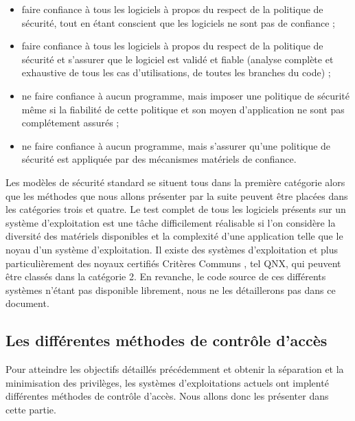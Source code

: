 \documentclass[pdftex,a4paper,titlepage,11pt]{article}
\begin{document}
\begin{itemize}
  \item faire confiance à tous les logiciels à propos du respect de la politique de sécurité, tout en étant conscient que les logiciels ne sont pas de confiance ;%
  \item faire confiance à tous les logiciels à propos du respect de la politique de sécurité et s'assurer que le logiciel est validé et fiable (analyse complète et exhaustive de tous les cas d'utilisations, de toutes les branches du code) ;%
  \item ne faire confiance à aucun programme, mais imposer une politique de sécurité même si la fiabilité de cette politique et son moyen d'application ne sont pas complétement assurés ;%
  \item ne faire confiance à aucun programme, mais s'assurer qu'une politique de sécurité est appliquée par des mécanismes matériels de confiance.%
\end{itemize}

Les modèles de sécurité standard se situent tous dans la première catégorie alors que les méthodes que nous allons présenter par la suite peuvent être placées dans les catégories trois et quatre. Le test complet de tous les logiciels présents sur un système d'exploitation est une tâche difficilement réalisable si l'on considère la diversité des matériels disponibles et la complexité d'une application telle que le noyau d'un système d'exploitation. Il existe des systèmes d'exploitation et plus particulièrement des noyaux certifiés Critères Communs \cite{CCCERT}, tel QNX\cite{QNX}, qui peuvent être classés dans la catégorie 2. En revanche, le code source de ces différents systèmes n'étant pas disponible librement, nous ne les détaillerons pas dans ce document.

\subsection{Les différentes méthodes de contrôle d'accès}

Pour atteindre les objectifs détaillés précédemment et obtenir la séparation et la minimisation des privilèges, les systèmes d'exploitations actuels ont implenté différentes méthodes de contrôle d'accès. Nous allons donc les présenter dans cette partie.
\end{document}

